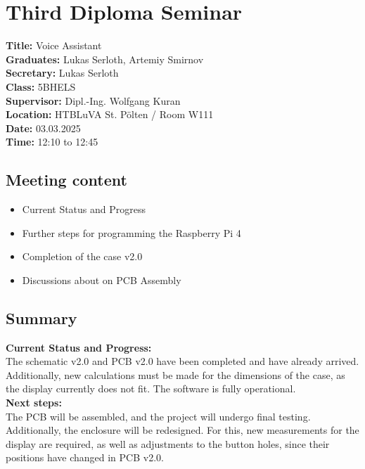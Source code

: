 
\section{Third Diploma Seminar}
\textbf{Title:} Voice Assistant\\

\noindent\textbf{Graduates:} Lukas Serloth, Artemiy Smirnov\\

\noindent\textbf{Secretary:} Lukas Serloth\\

\noindent\textbf{Class:} 5BHELS\\

\noindent\textbf{Supervisor:} Dipl.-Ing. Wolfgang Kuran\\

\noindent\textbf{Location:} HTBLuVA St. Pölten / Room W111\\

\noindent\textbf{Date:} 03.03.2025\\

\noindent\textbf{Time:} 12:10 to 12:45\\ 

\subsection{Meeting content}
\begin{itemize}
    \item Current Status and Progress
    \item Further steps for programming the Raspberry Pi 4
    \item Completion of the case v2.0
    \item Discussions about on PCB Assembly
\end{itemize}

\subsection{Summary}
\textbf{Current Status and Progress:\\} 
The schematic v2.0 and PCB v2.0 have been completed and have already arrived. Additionally, new calculations must be made for the dimensions of the case, as the display currently does not fit. The software is fully operational.\\

\noindent\textbf{Next steps:\\}
The PCB will be assembled, and the project will undergo final testing. Additionally, the enclosure will be redesigned.
For this, new measurements for the display are required, as well as adjustments to the button holes, since their positions have changed in PCB v2.0.
